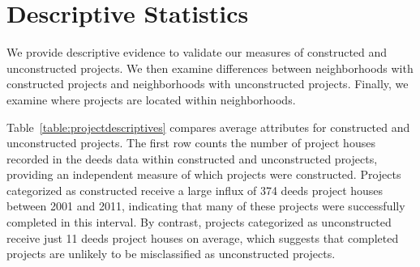 \documentclass[12pt]{article}
\begin{document}
\section{Descriptive Statistics}\label{section:descriptives}







We provide descriptive evidence to validate our measures of constructed and unconstructed projects.  We then examine differences between neighborhoods with constructed projects and neighborhoods with unconstructed projects.  Finally, we examine where projects are located within neighborhoods.  

Table~\ref{table:projectdescriptives} compares average attributes for constructed and unconstructed projects.  The first row counts the number of project houses recorded in the deeds data within constructed and unconstructed projects, providing an independent measure of which projects were constructed.  Projects categorized as constructed receive a large influx of 374 deeds project houses between 2001 and 2011, indicating that many of these projects were successfully completed in this interval.  By contrast, projects categorized as unconstructed receive just 11 deeds project houses on average, which suggests that completed projects are unlikely to be misclassified as unconstructed projects.   
\end{document}
